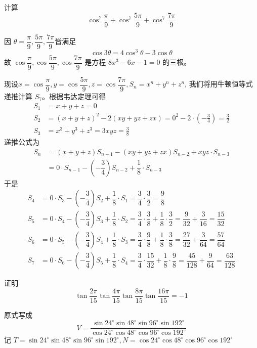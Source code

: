 \begin{questions}
    \question 计算
    \[
    \cos^7 \frac{\pi}{9} + \cos^7 \frac{5\pi}{9} + \cos^7 \frac{7\pi}{9}
    \]
    \begin{solution}
        因 \( \theta = \dfrac{\pi}{9},\dfrac{5\pi}{9},\dfrac{7\pi}{9} \)皆满足
        \[
        \cos 3\theta = 4\cos^3 \theta - 3\cos \theta
        \]
        故 \(  \cos \dfrac{\pi}{9},\cos \dfrac{5\pi}{9} , \cos \dfrac{7\pi}{9} \) 是方程 \( 8x^3 - 6x - 1 = 0 \) 的三根。
        
        现设$x=\cos \dfrac{\pi}{9},y=\cos \dfrac{5\pi}{9} , z=\cos \dfrac{7\pi}{9}, S_n = x^n + y^n + z^n$,
        我们将用牛顿恒等式递推计算 \( S_7 \)。根据韦达定理可得
        \[
        \begin{aligned}
        S_1 &= x + y + z = 0 \\
        S_2 &= (x + y + z)^2 - 2(xy + yz + zx) = 0^2 - 2\cdot\left(-\frac{3}{4}\right) = \frac{3}{2} \\
        S_3 &= x^3 + y^3 + z^3 = 3xyz = \frac{3}{8}
        \end{aligned}
        \]
        递推公式为
        \begin{align*}
        S_n &= (x+y+z)S_{n-1} - (xy+yz+zx)S_{n-2} + xyz \cdot S_{n-3} \\
        &=0 \cdot S_{n-1} - (-\dfrac{3}{4}) S_{n-2} + \dfrac{1}{8} \cdot S_{n-3}
        \end{align*}
        于是
        \[
        \begin{aligned}
        S_4 &= 0 \cdot S_3 - (-\dfrac{3}{4}) S_2 + \dfrac{1}{8} \cdot S_1 = \dfrac{3}{4} \cdot \dfrac{3}{2} = \dfrac{9}{8} \\
        S_5 &= 0 \cdot S_4 - (-\dfrac{3}{4}) S_3 + \dfrac{1}{8} \cdot S_2 = \dfrac{3}{4} \cdot \dfrac{3}{8} + \dfrac{1}{8} \cdot \dfrac{3}{2} = \dfrac{9}{32} + \dfrac{3}{16} = \dfrac{15}{32} \\
        S_6 &= 0 \cdot S_5 - (-\dfrac{3}{4}) S_4 + \dfrac{1}{8} \cdot S_3 = \dfrac{3}{4} \cdot \dfrac{9}{8} + \dfrac{1}{8} \cdot \dfrac{3}{8} = \dfrac{27}{32} + \dfrac{3}{64} = \dfrac{57}{64} \\
        S_7 &= 0 \cdot S_6 - (-\dfrac{3}{4}) S_5 + \dfrac{1}{8} \cdot S_4 = \dfrac{3}{4} \cdot \dfrac{15}{32} + \dfrac{1}{8} \cdot \dfrac{9}{8} = \dfrac{45}{128} + \dfrac{9}{64} = \dfrac{63}{128}
        \end{aligned}
        \]
    \end{solution}

    \question 证明
    \[
    \tan \dfrac{2\pi}{15} \tan \dfrac{4\pi}{15} \tan \dfrac{8\pi}{15} \tan \dfrac{16\pi}{15} = -1
    \]
    \begin{solution}
        原式写成
        \[
        V=\frac{\sin 24^\circ \sin 48^\circ \sin 96^\circ \sin 192^\circ}{\cos 24^\circ \cos 48^\circ \cos 96^\circ \cos 192^\circ}
        \]
        记 \(T = \sin 24^\circ \sin 48^\circ \sin 96^\circ \sin 192^\circ,N = \cos 24^\circ \cos 48^\circ \cos 96^\circ \cos 192^\circ\)
        

\end{solution}
\end{questions}
